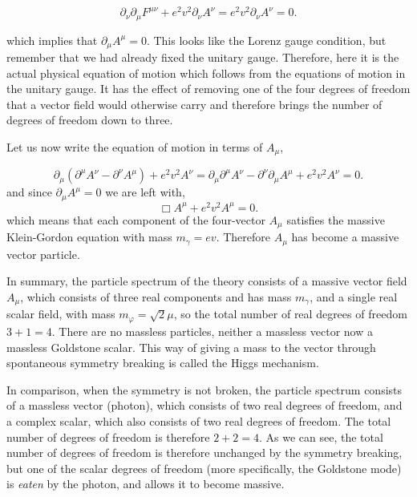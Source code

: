 \begin{equation}
\partial_{\nu}\partial_{\mu}F^{\mu\nu} + e^2v^2\partial_{\nu}A^{\nu} = e^2v^2\partial_{\nu}A^{\nu} = 0.
\end{equation}

which implies that $\partial_{\mu}A^{\mu} = 0$. This looks like the Lorenz gauge condition, but remember that we had already fixed the unitary gauge. Therefore, here it is the actual physical equation of motion which follows from the equations of motion in the unitary gauge. It has the effect of removing one of the four degrees of freedom that a vector field would otherwise carry and therefore brings the number of degrees of freedom down to three. 

Let us now write the equation of motion in terms of $A_{\mu}$, 

\begin{equation} \partial_{\mu}\left(\partial^{\mu}A^{\nu} - \partial^{\nu}A^{\mu}\right) + e^2v^2A^{\nu} = \partial_{\mu}\partial^{\mu}A^{\nu} - \partial^{\nu}\partial_{\mu}A^{\mu} + e^2v^2A^{\nu} = 0.
\end{equation}
and since $\partial_{\mu}A^{\mu} = 0$ we are left with, 
\begin{equation}
    \Box A^{\mu} + e^2v^2A^{\mu} = 0. 
\end{equation}
which means that each component of the four-vector $A_{\mu}$ satisfies the massive Klein-Gordon equation with mass $m_{\gamma} = ev$. Therefore $A_{\mu}$ has become a massive vector particle. 

In summary, the particle spectrum of the theory consists of a massive vector field $A_{\mu}$, which consists of three real components and has mass $m_{\gamma}$, and a single real scalar field, with mass $m_{\varphi} = \sqrt{2}\mu$, so the total number of real degrees of freedom $3 + 1 = 4$. There are no massless particles, neither a massless vector now a massless Goldstone scalar. This way of giving a mass to the vector through spontaneous symmetry breaking is called the Higgs mechanism. 

In comparison, when the symmetry is not broken, the particle spectrum consists of a massless vector (photon), which consists of two real degrees of freedom, and a complex scalar, which also consists of two real degrees of freedom. The total number of degrees of freedom is therefore $2+2=4$. As we can see, the total number of degrees of freedom is therefore unchanged by the symmetry breaking, but one of the scalar degrees of freedom (more specifically, the Goldstone mode) is \textit{eaten} by the photon, and allows it to become massive. 

